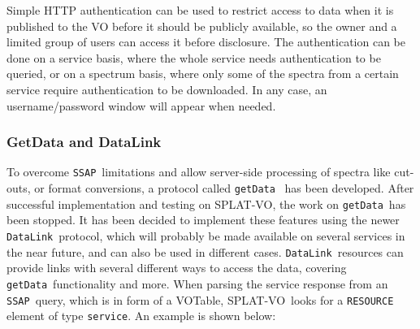 \documentclass[final,authoryear,5p,times,twocolumn]{elsarticle}
\newcommand{\datalink}{\texttt{DataLink}}
\newcommand{\ssap}{\texttt{SSAP}}
\newcommand{\getdata}{\texttt{getData}}
\newcommand{\votable}{VOTable}
\newcommand{\splatvo}{{\textsf{\small{SPLAT-VO}}}}
\begin{document}
Simple HTTP authentication can be used to restrict access to data when it is
published to the VO before it should be publicly available, so the owner and a
limited group of users can access it before disclosure. The authentication can
be done on a service basis, where the whole service needs authentication to be
queried, or on a spectrum basis, where only some of the spectra from a certain
service require authentication to be downloaded. In any case, an
username/password window will appear when needed.

\subsubsection{GetData and DataLink}

To overcome \ssap\ limitations and allow server-side processing of spectra like
cut-outs, or format conversions, a protocol called \getdata\ \citep{getData}
has been developed. After successful implementation and testing on \splatvo,
the work on \getdata\ has been stopped. It has been decided to implement these
features using the newer \datalink\ protocol, which will probably be made
available on several services in the near future, and can also be used in
different cases.  \datalink\ resources can provide links with several different
ways to access the data, covering \getdata\ functionality and more.  When
parsing the service response from an \ssap\ query, which is in form of a
\votable, \splatvo\ looks for a \texttt{RESOURCE} element of type
\texttt{service}.  An example is shown below:
\end{document}
